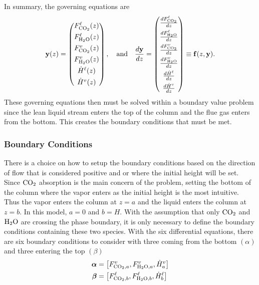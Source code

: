 \documentclass[a4paper,fleqn]{cas-sc}
\newcommand{\COtwo}{{\ce{CO2}}}
\newcommand{\HtwoO}{{\ce{H2O}}}
\newcommand{\liq}{\ell}
\newcommand{\vap}{v}
\begin{document}
    In summary, the governing equations are
    \begin{align}
        \mathbf{y}(z) =
        \begin{pmatrix}
            F^{\liq}_{\mathrm{CO_2}}(z)\\[4pt]
            F^{\liq}_{\mathrm{H_2O}}(z)\\[4pt]
            F^{\vap}_{\mathrm{CO_2}}(z)\\[4pt]
            F^{\vap}_{\mathrm{H_2O}}(z)\\[4pt]
            \dot{H}^{\liq}(z)\\[4pt]
            \dot{H}^{\vap}(z)
        \end{pmatrix},  \quad{} \text{and}
        \quad
        \frac{d\mathbf{y}}{dz} =
        \begin{pmatrix}
            \frac{d F^{\liq}_{ \COtwo}}{d z} \\[4pt]
            \frac{d F^{\liq}_{ \HtwoO}}{d z} \\[4pt]
            \frac{d F^{\vap}_{ \COtwo}}{d z} \\[4pt]
            \frac{d F^{\vap}_{ \HtwoO}}{d z} \\[4pt]
            \frac{d \dot{H}^{\liq}}{d z} \\[4pt]
            \frac{d \dot{H}^{\vap}}{d z}
        \end{pmatrix}
        \equiv
        \mathbf{f}(z, \mathbf{y}).
    \end{align}
    These governing equations then must be solved within a boundary value problem since the lean liquid stream enters the top of the column and the flue gas enters from the bottom. This creates the boundary conditions that must be met.

    \subsubsection{Boundary Conditions}
    There is a choice on how to setup the boundary conditions based on the direction of flow that is considered positive and or where the initial height will be set. Since $\COtwo$ absorption is the main concern of the problem, setting the bottom of the column where the vapor enters as the initial height is the most intuitive. Thus the vapor enters the column at $z = a$ and the liquid enters the column at $z = b$. In this model, $a = 0$ and $b = H$. With the assumption that only $\COtwo$ and $\HtwoO$ are crossing the phase boundary, it is only necessary to define the boundary conditions containing these two species. With the six differential equations, there are six boundary conditions to consider with three coming from the bottom $(\alpha)$ and three entering the top $(\beta)$
    \begin{align}
        \boldsymbol{\alpha} &= \left[F^{\vap}_{ \COtwo, a}, F^{\vap}_{ \HtwoO, a}, \dot{H}^{\vap}_{ a}\right]\\
        \boldsymbol{\beta} &= \left[F^{\liq}_{ \COtwo, b}, F^{\liq}_{ \HtwoO, b}, \dot{H}^{\liq}_{ b}\right]
    \end{align}
\end{document}
